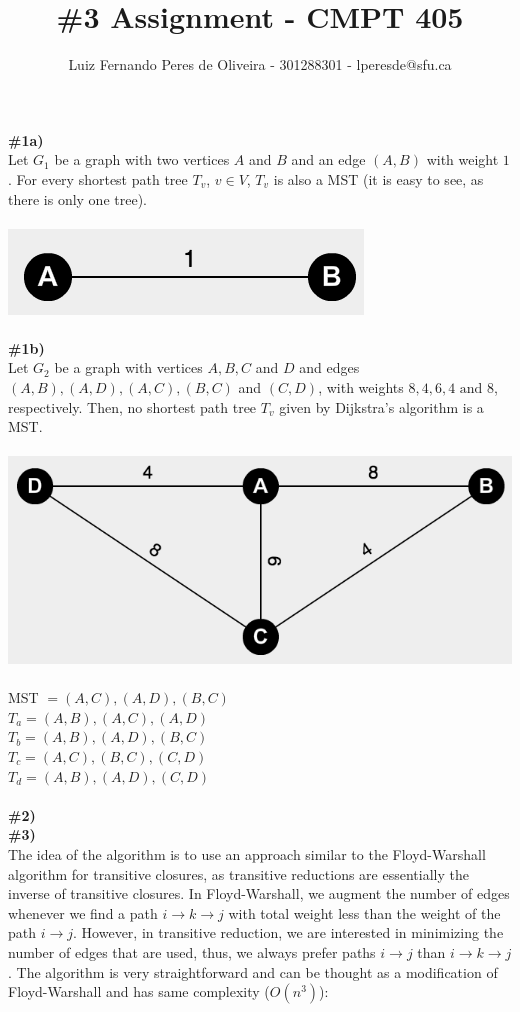 \documentclass{article}
\title{\#3 Assignment - CMPT 405}
\author{Luiz Fernando Peres de Oliveira - 301288301 - lperesde@sfu.ca}
\begin{document}
\maketitle
\textbf{\#1a)}
\\
Let $G_1$ be a graph with two vertices $A$ and $B$ and an edge $(A, B)$ with weight $1$. For every shortest path tree $T_v$, $v \in V$, $T_v$ is also a MST (it is easy to see, as there is only one tree).
\\
\\
\includegraphics[scale=0.6]{simple_graph_hw3}
\\
\\
\textbf{\#1b)}
\\
Let $G_2$ be a graph with vertices $A, B, C$ and $D$ and edges $(A, B), (A, D), (A,C), (B,C)$ and $(C,D)$, with weights $8, 4, 6, 4 \text{ and } 8$, respectively. Then, no shortest path tree $T_v$ given by Dijkstra's algorithm is a MST.
\\
\\
\includegraphics[scale=0.4]{complex_graph_hw3}
\\
\\
MST $= (A,C), (A,D), (B,C)$
\\
$T_a = (A, B), (A, C), (A, D)$
\\
$T_b = (A, B), (A, D), (B, C)$
\\
$T_c = (A, C), (B, C), (C, D)$
\\
$T_d = (A, B), (A, D), (C, D)$
\\
\\
\textbf{\#2)}
\\
\textbf{\#3)}
\\
The idea of the algorithm is to use an approach similar to the Floyd-Warshall algorithm for transitive closures, as transitive reductions are essentially the inverse of transitive closures. In Floyd-Warshall, we augment the number of edges whenever we find a path $i \rightarrow k \rightarrow j$ with total weight less than the weight of the path $i \rightarrow j$. However, in transitive reduction, we are interested in minimizing the number of edges that are used, thus, we always prefer paths $i \rightarrow j$ than $i \rightarrow k \rightarrow j$. The algorithm is very straightforward and can be thought as a modification of Floyd-Warshall and has same complexity ($O(n^3)$):
\end{document}
